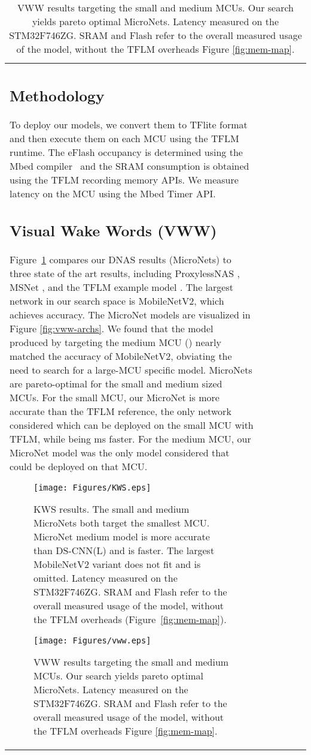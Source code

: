 \documentclass{article}
\begin{document}
\begin{table}[t]
\begin{tabular}{l| c | c | c | c | c}
\subsection{Methodology}
To deploy our models, we convert them to TFlite format and then execute them on each MCU using the TFLM runtime. 
The eFlash occupancy is determined using the Mbed compiler~\cite{mbed-os} and the SRAM consumption is obtained using the TFLM recording memory APIs. We measure latency on the MCU using the Mbed Timer API. 



\subsection{Visual Wake Words (VWW)}

Figure~\ref{fig:VWW} compares our DNAS results (MicroNets) to three state of the art results, including ProxylessNAS \cite{cai2018proxylessnas}, MSNet \cite{cheng2019msnet}, and the TFLM example model \cite{chowdhery2019visual}. The largest network in our search space is MobileNetV2, which achieves  accuracy. The MicroNet models are visualized in Figure \ref{fig:vww-archs}. We found that the model produced by targeting the medium MCU () nearly matched the accuracy of MobileNetV2, obviating the need to search for a large-MCU specific model. MicroNets are pareto-optimal for the small and medium sized MCUs. For the small MCU, our MicroNet is  more accurate than the TFLM reference, the only network considered which can be deployed on the small MCU with TFLM, while being ms faster. For the medium MCU, our MicroNet model was the only model considered that could be deployed on that MCU. 

\begin{figure}[t]
    \texttt{[image: Figures/KWS.eps]}
\vspace{-25pt}
\caption{
KWS results. The small and medium MicroNets both target the smallest MCU.
MicroNet medium model is more accurate than DS-CNN(L) and is  faster. 
The largest MobileNetV2 variant does not fit and is omitted.
Latency measured on the STM32F746ZG. SRAM and Flash refer to the overall measured usage of the model, without the TFLM overheads (Figure~\ref{fig:mem-map}). 
}
    \label{fig:kws}


\end{figure}


\begin{figure}[t]
    \texttt{[image: Figures/vww.eps]}
\vspace{-25pt}
    \caption{
    VWW results targeting the small and medium MCUs. Our search yields pareto optimal MicroNets.
Latency measured on the STM32F746ZG. SRAM and Flash refer to the overall measured usage of the model, without the TFLM overheads Figure \ref{fig:mem-map}.
}
    \label{fig:VWW}



\end{figure}
\end{tabular}
\end{table}
\end{document}
